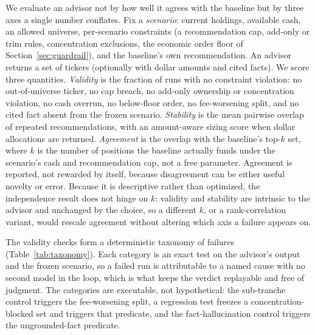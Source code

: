 \documentclass[sigconf,review,anonymous]{acmart}
\begin{document}
We evaluate an advisor not by how well it agrees with the baseline but by three axes a single number conflates. Fix a \emph{scenario}: current holdings, available cash, an allowed universe, per-scenario constraints (a recommendation cap, add-only or trim rules, concentration exclusions, the economic order floor of Section~\ref{sec:guardrail}), and the baseline's own recommendation. An advisor returns a set of tickers (optionally with dollar amounts and cited facts). We score three quantities. \emph{Validity} is the fraction of runs with no constraint violation: no out-of-universe ticker, no cap breach, no add-only ownership or concentration violation, no cash overrun, no below-floor order, no fee-worsening split, and no cited fact absent from the frozen scenario. \emph{Stability} is the mean pairwise overlap of repeated recommendations, with an amount-aware sizing score when dollar allocations are returned. \emph{Agreement} is the overlap with the baseline's top-$k$ set, where $k$ is the number of positions the baseline actually funds under the scenario's cash and recommendation cap, not a free parameter. Agreement is reported, not rewarded by itself, because disagreement can be either useful novelty or error. Because it is descriptive rather than optimized, the independence result does not hinge on $k$: validity and stability are intrinsic to the advisor and unchanged by the choice, so a different $k$, or a rank-correlation variant, would rescale agreement without altering which axis a failure appears on.

The validity checks form a deterministic taxonomy of failures (Table~\ref{tab:taxonomy}). Each category is an exact test on the advisor's output and the frozen scenario, so a failed run is attributable to a named cause with no second model in the loop, which is what keeps the verdict replayable and free of judgment. The categories are executable, not hypothetical: the sub-tranche control triggers the fee-worsening split, a regression test freezes a concentration-blocked set and triggers that predicate, and the fact-hallucination control triggers the ungrounded-fact predicate.
\end{document}
